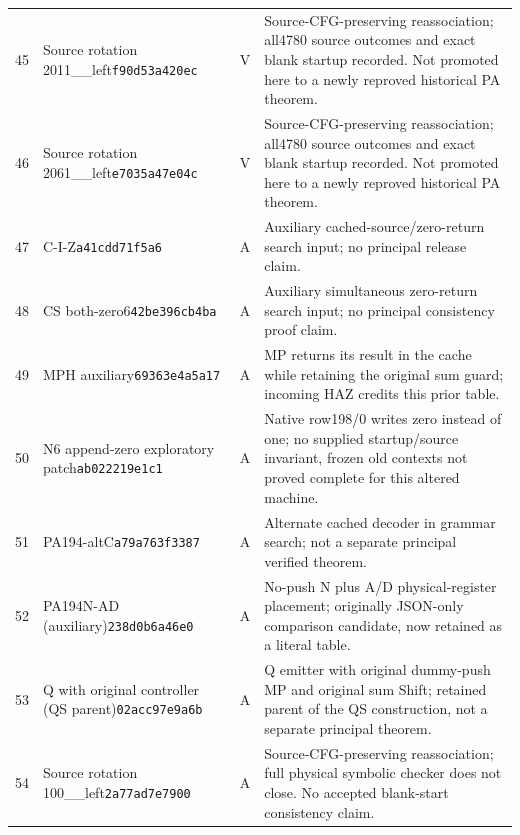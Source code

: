 \begin{longtable}{@{}rp{}cp{}@{}}
45 & Source rotation 2011\_\allowbreak 2012\_\allowbreak left\newline\texttt{f90d53a420ec} & V & Source-CFG-preserving reassociation; all4780 source outcomes and exact blank startup recorded. Not promoted here to a newly reproved historical PA theorem.\\[5pt]
46 & Source rotation 2061\_\allowbreak 2062\_\allowbreak left\newline\texttt{e7035a47e04c} & V & Source-CFG-preserving reassociation; all4780 source outcomes and exact blank startup recorded. Not promoted here to a newly reproved historical PA theorem.\\[5pt]
47 & C-I-Z\newline\texttt{a41cdd71f5a6} & A & Auxiliary cached-source/zero-return search input; no principal release claim.\\[5pt]
48 & CS both-zero6\newline\texttt{42be396cb4ba} & A & Auxiliary simultaneous zero-return search input; no principal consistency proof claim.\\[5pt]
49 & MPH auxiliary\newline\texttt{69363e4a5a17} & A & MP returns its result in the cache while retaining the original sum guard; incoming HAZ credits this prior table.\\[5pt]
50 & N6 append-zero exploratory patch\newline\texttt{ab022219e1c1} & A & Native row198/0 writes zero instead of one; no supplied startup/source invariant, frozen old contexts not proved complete for this altered machine.\\[5pt]
51 & PA194-altC\newline\texttt{a79a763f3387} & A & Alternate cached decoder in grammar search; not a separate principal verified theorem.\\[5pt]
52 & PA194N-AD (auxiliary)\newline\texttt{238d0b6a46e0} & A & No-push N plus A/D physical-register placement; originally JSON-only comparison candidate, now retained as a literal table.\\[5pt]
53 & Q with original controller (QS parent)\newline\texttt{02acc97e9a6b} & A & Q emitter with original dummy-push MP and original sum Shift; retained parent of the QS construction, not a separate principal theorem.\\[5pt]
54 & Source rotation 100\_\allowbreak 164\_\allowbreak left\newline\texttt{2a77ad7e7900} & A & Source-CFG-preserving reassociation; full physical symbolic checker does not close. No accepted blank-start consistency claim.\\[5pt]

\end{longtable}
